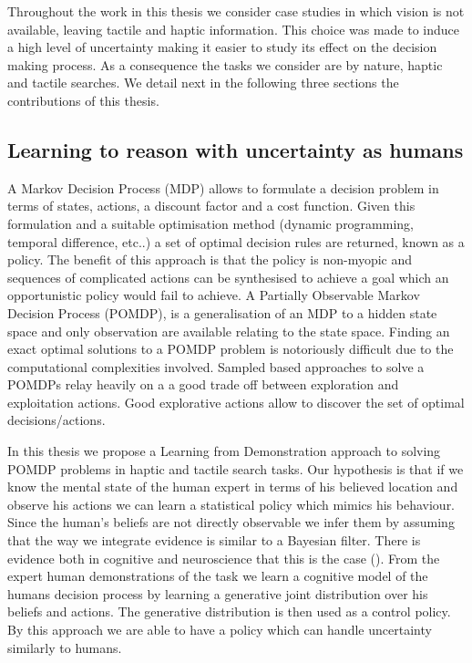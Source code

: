 Throughout the work in this thesis we consider case studies in which vision is not available, leaving tactile and 
haptic information. This choice was made to induce a high level of uncertainty making it easier to study its effect 
on the decision making process. As a consequence the tasks we consider are by nature, haptic and tactile searches.
We detail next in the following three sections the contributions of this thesis.

\subsection{Learning to reason with uncertainty as humans}

A Markov Decision Process (MDP) allows to formulate a decision problem in terms of states, actions, a discount factor 
and a cost function. Given this formulation and a suitable optimisation method (dynamic programming, temporal difference, etc..) 
a set of optimal decision rules are returned, known as a policy. The benefit of this approach 
is that the policy is non-myopic and sequences of complicated actions can be synthesised to achieve a goal which 
an opportunistic policy would fail to achieve. A Partially Observable Markov Decision Process (POMDP), is 
a generalisation of an MDP to a hidden state space and only observation are available relating 
to the state space. Finding an exact optimal solutions to a POMDP problem is notoriously difficult due to 
the computational complexities involved. Sampled based approaches to solve a POMDPs relay heavily on a 
a good trade off between exploration and exploitation actions. Good explorative actions allow to discover 
the set of optimal decisions/actions.


In this thesis we propose a Learning from Demonstration approach to solving POMDP problems in
haptic and tactile search tasks. Our hypothesis is that if we know the mental state of the human 
expert in terms of his believed location and observe his actions we can learn a statistical policy 
which mimics his behaviour. Since the human's beliefs are not directly observable we infer them 
by assuming that the way we integrate evidence is similar to a Bayesian filter. There is   
evidence both in cognitive and neuroscience that this is the case (\cite{Bake_Saxe_Tene_2011}). From 
the expert human demonstrations of the task we learn a cognitive model of the humans decision process 
by learning a generative joint distribution over his beliefs and actions. The generative distribution 
is then used as a control policy. By this approach we are able to have a policy which can handle uncertainty
similarly to humans. 

